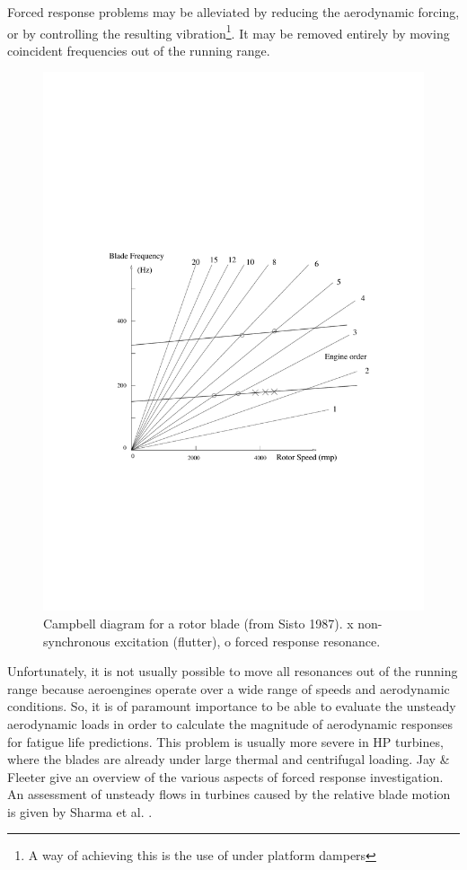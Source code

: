  Forced response problems may be alleviated by reducing the
 aerodynamic forcing, or by controlling the resulting
 vibration\footnote{A way of achieving this is the use of under platform
 dampers}. It may be removed entirely by moving coincident frequencies
 out of the running range.
%
\begin{figure}[ht]
  \centerline{\includegraphics[width=130mm, clip=t]{CHAP_INTRO/FIGURE/campell.pdf}}
  \caption{Campbell diagram for a rotor blade (from Sisto 1987).
   x non-synchronous excitation (flutter), o forced response resonance.}
  \label{campell.fig}
\end{figure}
%
 Unfortunately, it is not usually possible to move all resonances out of the
 running range because aeroengines operate over a wide range
 of speeds and aerodynamic conditions.
 So, it is of paramount importance to be able to evaluate the unsteady
 aerodynamic loads in order to calculate the magnitude of aerodynamic
 responses for fatigue life predictions.
 This problem is usually more severe in HP turbines, where the
 blades are already under large thermal and centrifugal loading.
 Jay \& Fleeter \citeyear{Fleeter:2} give an overview of the various
 aspects of forced response investigation. An assessment of unsteady flows
 in turbines caused by the relative blade motion is given
 by Sharma et al. \citeyear{Sharma:1}.

